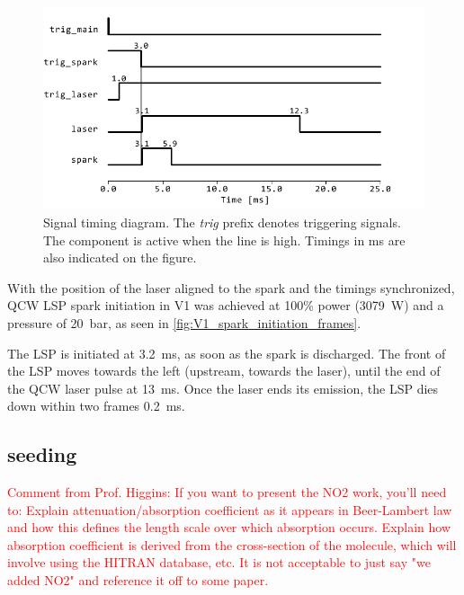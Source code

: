             \begin{figure}[!ht]
                \centering
                \includegraphics[width=\textwidth]{assets/4 experiments/timings.pdf}
                \caption{Signal timing diagram. The \textit{trig} prefix denotes triggering signals. The component is active when the line is high. Timings in \unit{ms} are also indicated on the figure.}
                \label{fig: Signal timing diagram}
            \end{figure}

            With the position of the laser aligned to the spark and the timings synchronized, QCW LSP spark initiation in V1 was achieved at 100\% power (\qty{3079}{W}) and a pressure of \qty{20}{bar}, as seen in \autoref{fig:V1_spark_initiation_frames}.
            
            
            
            The LSP is initiated at \qty{3.2}{ms}, as soon as the spark is discharged. The front of the LSP moves towards the left (upstream, towards the laser), until the end of the QCW laser pulse at \qty{13}{ms}. Once the laser ends its emission, the LSP dies down within two  frames \qty{0.2}{ms}.

        \subsection{ seeding}

            \textcolor{red}{Comment from Prof. Higgins: If you want to present the NO2 work, you'll need to: Explain attenuation/absorption coefficient as it appears in Beer-Lambert law and how this defines the length scale over which absorption occurs. Explain how absorption coefficient is derived from the cross-section of the molecule, which will involve using the HITRAN database, etc. It is not acceptable to just say "we added NO2" and reference it off to some paper.}
            

